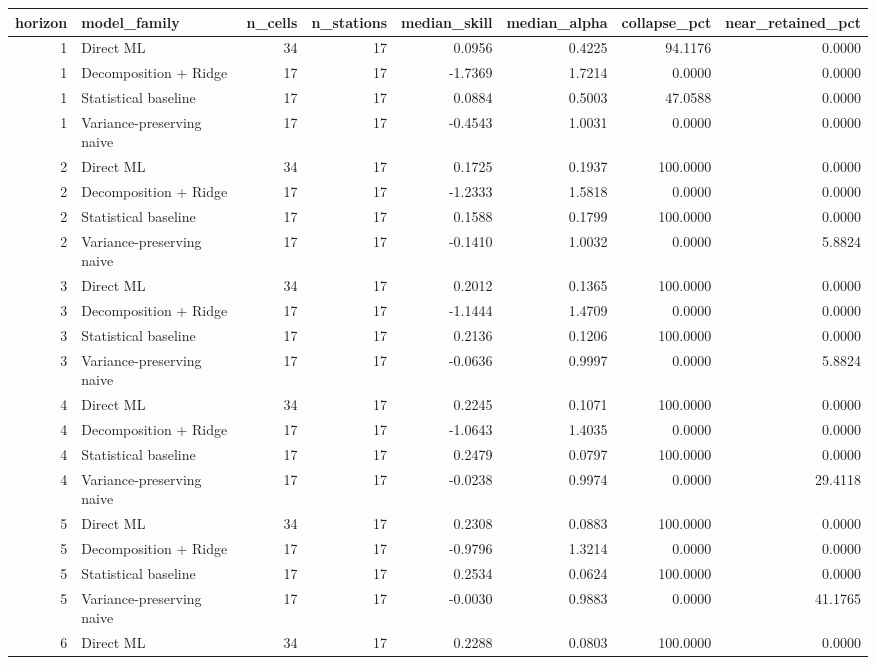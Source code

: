 \begin{tabular}{rlrrrrrr}
\toprule
horizon & model\_family & n\_cells & n\_stations & median\_skill & median\_alpha & collapse\_pct & near\_retained\_pct \\
\midrule
1 & Direct ML & 34 & 17 & 0.0956 & 0.4225 & 94.1176 & 0.0000 \\
1 & Decomposition + Ridge & 17 & 17 & -1.7369 & 1.7214 & 0.0000 & 0.0000 \\
1 & Statistical baseline & 17 & 17 & 0.0884 & 0.5003 & 47.0588 & 0.0000 \\
1 & Variance-preserving naive & 17 & 17 & -0.4543 & 1.0031 & 0.0000 & 0.0000 \\
2 & Direct ML & 34 & 17 & 0.1725 & 0.1937 & 100.0000 & 0.0000 \\
2 & Decomposition + Ridge & 17 & 17 & -1.2333 & 1.5818 & 0.0000 & 0.0000 \\
2 & Statistical baseline & 17 & 17 & 0.1588 & 0.1799 & 100.0000 & 0.0000 \\
2 & Variance-preserving naive & 17 & 17 & -0.1410 & 1.0032 & 0.0000 & 5.8824 \\
3 & Direct ML & 34 & 17 & 0.2012 & 0.1365 & 100.0000 & 0.0000 \\
3 & Decomposition + Ridge & 17 & 17 & -1.1444 & 1.4709 & 0.0000 & 0.0000 \\
3 & Statistical baseline & 17 & 17 & 0.2136 & 0.1206 & 100.0000 & 0.0000 \\
3 & Variance-preserving naive & 17 & 17 & -0.0636 & 0.9997 & 0.0000 & 5.8824 \\
4 & Direct ML & 34 & 17 & 0.2245 & 0.1071 & 100.0000 & 0.0000 \\
4 & Decomposition + Ridge & 17 & 17 & -1.0643 & 1.4035 & 0.0000 & 0.0000 \\
4 & Statistical baseline & 17 & 17 & 0.2479 & 0.0797 & 100.0000 & 0.0000 \\
4 & Variance-preserving naive & 17 & 17 & -0.0238 & 0.9974 & 0.0000 & 29.4118 \\
5 & Direct ML & 34 & 17 & 0.2308 & 0.0883 & 100.0000 & 0.0000 \\
5 & Decomposition + Ridge & 17 & 17 & -0.9796 & 1.3214 & 0.0000 & 0.0000 \\
5 & Statistical baseline & 17 & 17 & 0.2534 & 0.0624 & 100.0000 & 0.0000 \\
5 & Variance-preserving naive & 17 & 17 & -0.0030 & 0.9883 & 0.0000 & 41.1765 \\
6 & Direct ML & 34 & 17 & 0.2288 & 0.0803 & 100.0000 & 0.0000 \\

\end{tabular}
